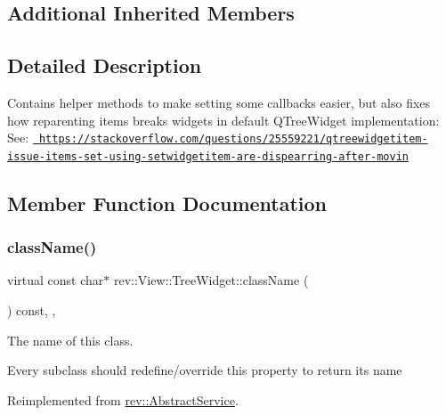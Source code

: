 \subsection*{Additional Inherited Members}


\subsection{Detailed Description}
Contains helper methods to make setting some callbacks easier, but also fixes how reparenting items breaks widgets in default Q\+Tree\+Widget implementation\+: See\+: \href{https://stackoverflow.com/questions/25559221/qtreewidgetitem-issue-items-set-using-setwidgetitem-are-dispearring-after-movin}{\texttt{ https\+://stackoverflow.\+com/questions/25559221/qtreewidgetitem-\/issue-\/items-\/set-\/using-\/setwidgetitem-\/are-\/dispearring-\/after-\/movin}} 

\subsection{Member Function Documentation}
\mbox{\label{classrev_1_1_view_1_1_tree_widget_aedde04f44badced7c60f0e1570e3d0b2}} 
\subsubsection{\texorpdfstring{className()}{className()}}
{\footnotesize\ttfamily virtual const char$\ast$ rev\+::\+View\+::\+Tree\+Widget\+::class\+Name (\begin{DoxyParamCaption}{ }\end{DoxyParamCaption}) const\hspace{0.3cm}{\ttfamily [inline]}, {\ttfamily [override]}, {\ttfamily [virtual]}}



The name of this class. 

Every subclass should redefine/override this property to return its name 

Reimplemented from \mbox{\hyperlink{classrev_1_1_abstract_service_a0b64ee4651db7637a70265697ca62453}{rev\+::\+Abstract\+Service}}.



